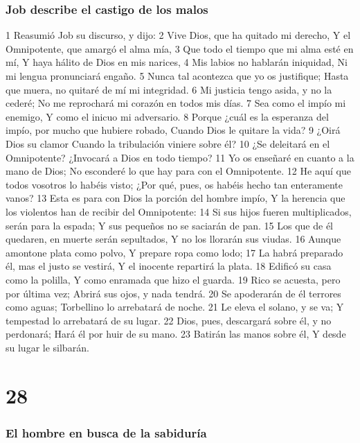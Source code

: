 \subsection*{Job describe el castigo de los malos}  

1 Reasumió Job su discurso, y dijo:  
2 Vive Dios, que ha quitado mi derecho,  
Y el Omnipotente, que amargó el alma mía,  
3 Que todo el tiempo que mi alma esté en mí,  
Y haya hálito de Dios en mis narices,  
4 Mis labios no hablarán iniquidad,  
Ni mi lengua pronunciará engaño.  
5 Nunca tal acontezca que yo os justifique;  
Hasta que muera, no quitaré de mí mi integridad.  
6 Mi justicia tengo asida, y no la cederé;  
No me reprochará mi corazón en todos mis días.  
7 Sea como el impío mi enemigo,  
Y como el inicuo mi adversario.  
8 Porque ¿cuál es la esperanza del impío, por mucho que hubiere robado,  
Cuando Dios le quitare la vida?  
9 ¿Oirá Dios su clamor  
Cuando la tribulación viniere sobre él?  
10 ¿Se deleitará en el Omnipotente?  
¿Invocará a Dios en todo tiempo?  
11 Yo os enseñaré en cuanto a la mano de Dios;  
No esconderé lo que hay para con el Omnipotente.  
12 He aquí que todos vosotros lo habéis visto;  
¿Por qué, pues, os habéis hecho tan enteramente vanos?  
13 Esta es para con Dios la porción del hombre impío,  
Y la herencia que los violentos han de recibir del Omnipotente:  
14 Si sus hijos fueren multiplicados, serán para la espada;  
Y sus pequeños no se saciarán de pan.  
15 Los que de él quedaren, en muerte serán sepultados,  
Y no los llorarán sus viudas.  
16 Aunque amontone plata como polvo,  
Y prepare ropa como lodo;  
17 La habrá preparado él, mas el justo se vestirá,  
Y el inocente repartirá la plata.  
18 Edificó su casa como la polilla,  
Y como enramada que hizo el guarda.  
19 Rico se acuesta, pero por última vez;  
Abrirá sus ojos, y nada tendrá.  
20 Se apoderarán de él terrores como aguas;  
Torbellino lo arrebatará de noche.  
21 Le eleva el solano, y se va;  
Y tempestad lo arrebatará de su lugar.  
22 Dios, pues, descargará sobre él, y no perdonará;  
Hará él por huir de su mano.  
23 Batirán las manos sobre él,  
Y desde su lugar le silbarán.  

\chapter{28}

\subsection*{El hombre en busca de la sabiduría}  

